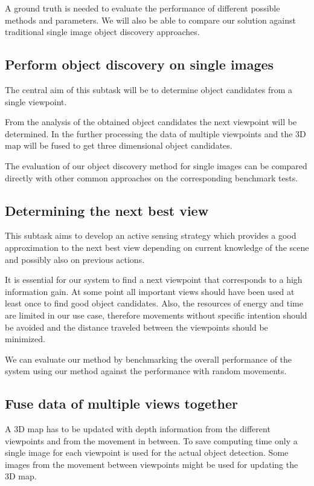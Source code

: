 \documentclass[a4paper,11pt,english]{article}
\begin{document}
A ground truth is needed to evaluate the performance of different possible methods and parameters.
We will also be able to compare our solution against traditional single image object discovery approaches.

\subsection{Perform object discovery on single images}
The central aim of this subtask will be to determine object candidates from a single viewpoint.

From the analysis of the obtained object candidates the next viewpoint will be determined.
In the further processing the data of multiple viewpoints and the 3D map will be fused to get three dimensional object candidates.

The evaluation of our object discovery method for single images can be compared directly with other common approaches on the corresponding benchmark tests.

\subsection{Determining the next best view}
This subtask aims to develop an active sensing strategy which provides a good approximation to the next best view depending on current knowledge of the scene and possibly also on previous actions.

It is essential for our system to find a next viewpoint that corresponds to a high information gain.
At some point all important views should have been used at least once to find good object candidates.
Also, the resources of energy and time are limited in our use case, therefore movements without specific intention should be avoided and the distance traveled between the viewpoints should be minimized.

We can evaluate our method by benchmarking the overall performance of the system using our method against the performance with random movements.

\subsection{Fuse data of multiple views together}
A 3D map has to be updated with depth information from the different viewpoints and from the movement in between.
To save computing time only a single image for each viewpoint is used for the actual object detection.
Some images from the movement between viewpoints might be used for updating the 3D map.
\end{document}
